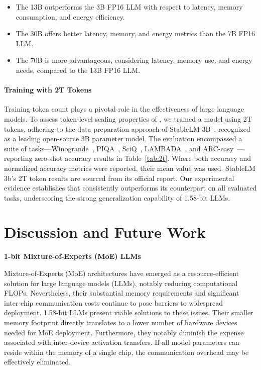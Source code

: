 \begin{itemize}
    \item The 13B  outperforms the 3B FP16 LLM with respect to latency, memory consumption, and energy efficiency.
    \item The 30B  offers better latency, memory, and energy metrics than the 7B FP16 LLM.
    \item The 70B  is more advantageous, considering latency, memory use, and energy needs, compared to the 13B FP16 LLM.
\end{itemize}

\paragraph{Training with 2T Tokens}

Training token count plays a pivotal role in the effectiveness of large language models. To assess token-level scaling properties of , we trained a  model using 2T tokens, adhering to the data preparation approach of StableLM-3B~\cite{StableLM-3B-4E1T}, recognized as a leading open-source 3B parameter model. The evaluation encompassed a suite of tasks—Winogrande~\cite{winoGrande}, PIQA~\cite{piqa}, SciQ~\cite{sciq}, LAMBADA~\cite{lambada}, and ARC-easy~\cite{arc}—reporting zero-shot accuracy results in Table~\ref{tab:2t}. Where both accuracy and normalized accuracy metrics were reported, their mean value was used. StableLM 3b’s 2T token results are sourced from its official report. Our experimental evidence establishes that  consistently outperforms its counterpart on all evaluated tasks, underscoring the strong generalization capability of 1.58-bit LLMs.

\section{Discussion and Future Work}

\textbf{1-bit Mixture-of-Experts (MoE) LLMs}

Mixture-of-Experts (MoE) architectures have emerged as a resource-efficient solution for large language models (LLMs), notably reducing computational FLOPs. Nevertheless, their substantial memory requirements and significant inter-chip communication costs continue to pose barriers to widespread deployment. 1.58-bit LLMs present viable solutions to these issues. Their smaller memory footprint directly translates to a lower number of hardware devices needed for MoE deployment. Furthermore, they notably diminish the expense associated with inter-device activation transfers. If all model parameters can reside within the memory of a single chip, the communication overhead may be effectively eliminated.

